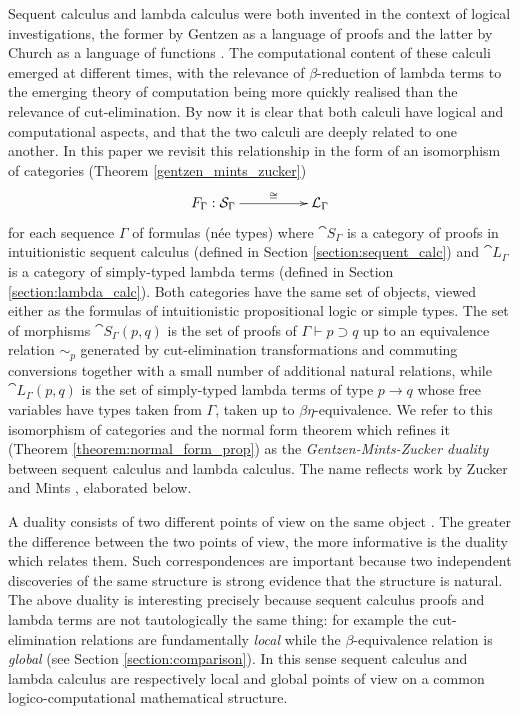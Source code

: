 \documentclass[english,letter paper,12pt,leqno]{article}
\theoremstyle{example}
\numberwithin{equation}{section}
\def\be{\begin{equation}}
\def\ee{\end{equation}}
\def\imp{\supset}
\begin{document}
Sequent calculus and lambda calculus were both invented in the context of logical investigations, the former by Gentzen as a language of proofs \cite{gentzen} and the latter by Church as a language of functions \cite{church}. The computational content of these calculi emerged at different times, with the relevance of $\beta$-reduction of lambda terms to the emerging theory of computation being more quickly realised than the relevance of cut-elimination. By now it is clear that both calculi have logical and computational aspects, and that the two calculi are deeply related to one another. In this paper we revisit this relationship in the form of an isomorphism of categories (Theorem \ref{gentzen_mints_zucker})
\be\label{eq:curry_howard_duality}
\xymatrix@C+2pc{
F_\Gamma: \cat{S}_\Gamma \ar[r]^-{\cong} & \cat{L}_\Gamma
}
\ee
for each sequence $\Gamma$ of formulas (n\'ee types) where $\cat{S}_\Gamma$ is a category of proofs in intuitionistic sequent calculus (defined in Section \ref{section:sequent_calc}) and $\cat{L}_\Gamma$ is a category of simply-typed lambda terms (defined in Section \ref{section:lambda_calc}). Both categories have the same set of objects, viewed either as the formulas of intuitionistic propositional logic or simple types. The set of morphisms $\cat{S}_\Gamma(p,q)$ is the set of proofs of $\Gamma \vdash p \imp q$ up to an equivalence relation $\sim_p$ generated by cut-elimination transformations and commuting conversions together with a small number of additional natural relations, while $\cat{L}_\Gamma(p,q)$ is the set of simply-typed lambda terms of type $p \rightarrow q$ whose free variables have types taken from $\Gamma$, taken up to $\beta \eta$-equivalence. We refer to this isomorphism of categories and the normal form theorem which refines it (Theorem \ref{theorem:normal_form_prop}) as the \emph{Gentzen-Mints-Zucker duality} between sequent calculus and lambda calculus. The name reflects work by Zucker \cite{zucker} and Mints \cite{mints}, elaborated below.

A duality consists of two different points of view on the same object \cite{atiyah}. The greater the difference between the two points of view, the more informative is the duality which relates them. Such correspondences are important because two independent discoveries of the same structure is strong evidence that the structure is natural. The above duality is interesting precisely because sequent calculus proofs and lambda terms are not tautologically the same thing: for example the cut-elimination relations are fundamentally \emph{local} while the $\beta$-equivalence relation is \emph{global} (see Section \ref{section:comparison}). In this sense sequent calculus and lambda calculus are respectively local and global points of view on a common logico-computational mathematical structure.
\\
\end{document}
